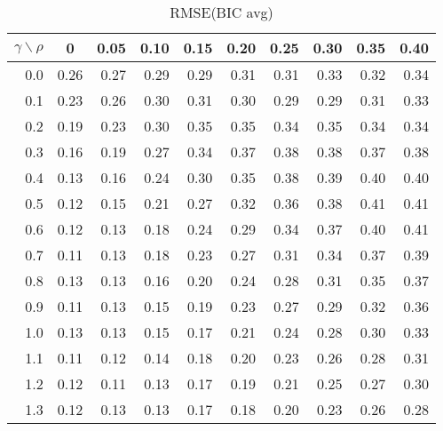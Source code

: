 \documentclass[12pt]{article}
\begin{document}
\begin{table}[!tbp]
\caption{RMSE(BIC avg)}
 \begin{center}
 \begin{tabular}{r|rrrrrrrrr}\hline\hline
\multicolumn{1}{c|}{$\gamma\backslash\rho$}&\multicolumn{1}{c}{0}&\multicolumn{1}{c}{0.05}&\multicolumn{1}{c}{0.10}&\multicolumn{1}{c}{0.15}&\multicolumn{1}{c}{0.20}&\multicolumn{1}{c}{0.25}&\multicolumn{1}{c}{0.30}&\multicolumn{1}{c}{0.35}&\multicolumn{1}{c}{0.40}\tabularnewline
\hline

0.0&0.26&0.27&0.29&0.29&0.31&0.31&0.33&0.32&0.34\tabularnewline
0.1&0.23&0.26&0.30&0.31&0.30&0.29&0.29&0.31&0.33\tabularnewline
0.2&0.19&0.23&0.30&0.35&0.35&0.34&0.35&0.34&0.34\tabularnewline
0.3&0.16&0.19&0.27&0.34&0.37&0.38&0.38&0.37&0.38\tabularnewline
0.4&0.13&0.16&0.24&0.30&0.35&0.38&0.39&0.40&0.40\tabularnewline
0.5&0.12&0.15&0.21&0.27&0.32&0.36&0.38&0.41&0.41\tabularnewline
0.6&0.12&0.13&0.18&0.24&0.29&0.34&0.37&0.40&0.41\tabularnewline
0.7&0.11&0.13&0.18&0.23&0.27&0.31&0.34&0.37&0.39\tabularnewline
0.8&0.13&0.13&0.16&0.20&0.24&0.28&0.31&0.35&0.37\tabularnewline
0.9&0.11&0.13&0.15&0.19&0.23&0.27&0.29&0.32&0.36\tabularnewline
1.0&0.13&0.13&0.15&0.17&0.21&0.24&0.28&0.30&0.33\tabularnewline
1.1&0.11&0.12&0.14&0.18&0.20&0.23&0.26&0.28&0.31\tabularnewline
1.2&0.12&0.11&0.13&0.17&0.19&0.21&0.25&0.27&0.30\tabularnewline
1.3&0.12&0.13&0.13&0.17&0.18&0.20&0.23&0.26&0.28\tabularnewline
\hline
\end{tabular}

\end{center}

\end{table}

%
\end{document}
